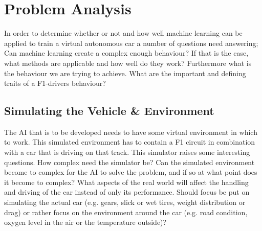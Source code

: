 

\chapter{Problem Analysis}
In order to determine whether or not and how well machine learning can be applied to train a virtual autonomous car a number of questions need answering; Can machine learning create a complex enough behaviour? If that is the case, what methods are applicable and how well do they work? Furthermore what is the behaviour we are trying to achieve. What are the important and defining traits of a F1-drivers behaviour? 

\section{Simulating the Vehicle \& Environment}
The AI that is to be developed needs to have some virtual environment in which to work. This simulated environment has to contain a F1 circuit in combination with a car that is driving on that track. This simulator raises some interesting questions. How complex need the simulator be? Can the simulated environment become to complex for the AI to solve the problem, and if so at what point does it become to complex? What aspects of the real world will affect the handling and driving of the car instead of only its performance. Should focus be put on simulating the actual car (e.g. gears, slick or wet tires, weight distribution or drag) or rather focus on the environment around the car (e.g. road condition, oxygen level in the air or the temperature outside)?

